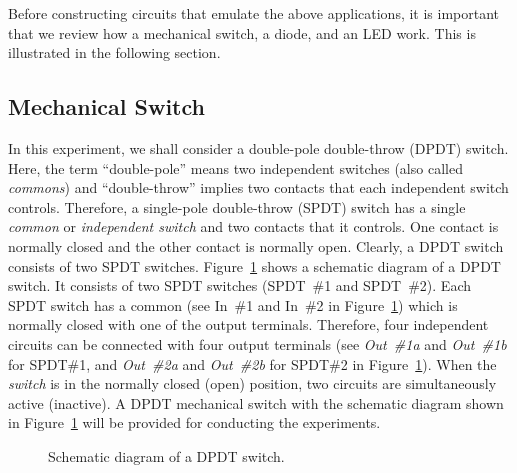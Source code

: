 Before constructing circuits that emulate the above applications, it is important that we review how a mechanical switch, a diode, and an LED work. This is illustrated in the following section. 

\subsection{Mechanical Switch}
In this experiment, we shall consider  a double-pole double-throw (DPDT) switch.  Here, the term ``double-pole'' means two independent switches (also called \emph{commons}) and ``double-throw'' implies two contacts that each independent switch controls. Therefore, a single-pole double-throw (SPDT) switch has a single \emph{common} or \emph{independent switch} and two contacts that it controls. One contact is normally closed and the other contact is normally open. Clearly, a DPDT switch consists of two SPDT switches.  Figure~\ref{fig:DPDT} shows a schematic diagram of a DPDT switch. It consists of two SPDT switches (SPDT~\#1 and SPDT~\#2). Each SPDT switch has a common (see In~\#1 and In~\#2 in Figure~\ref{fig:DPDT}) which is normally closed with one of the output terminals. Therefore, four independent circuits can be connected with four output terminals  (see \emph{Out~\#1a} and  \emph{Out~\#1b} for SPDT\#1, and  \emph{Out~\#2a} and  \emph{Out~\#2b} for SPDT\#2 in Figure~\ref{fig:DPDT}). When the \emph{switch} is in the normally closed (open) position, two circuits are simultaneously active (inactive). A DPDT mechanical switch with the schematic diagram shown in Figure~\ref{fig:DPDT} will be provided for conducting the experiments. 
%

\begin{figure}
  \centering
  \caption{Schematic diagram of a DPDT switch.}
  \label{fig:DPDT}
\end{figure}
%

